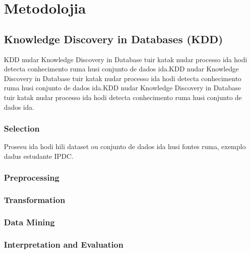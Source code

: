 
\chapter{Metodolojia}

\section{Knowledge Discovery in Databases (KDD)}
KDD nudar Knowledge Discovery in Database tuir \citep{Fayyad} katak nudar processo ida hodi detecta conhecimento ruma husi conjunto de dados ida.KDD nudar Knowledge Discovery in Database tuir \citep{Fayyad} katak nudar processo ida hodi detecta conhecimento ruma husi conjunto de dados ida.KDD nudar Knowledge Discovery in Database tuir \citep{Fayyad} katak nudar processo ida hodi detecta conhecimento ruma husi conjunto de dados ida.


\subsection{Selection}
Prosesu ida hodi hili dataset ou conjunto de dados ida husi fontes ruma, exemplo dadus estudante IPDC.

\subsection{Preprocessing}
\subsection{Transformation}
\subsection{Data Mining}
\subsection{Interpretation and Evaluation}

